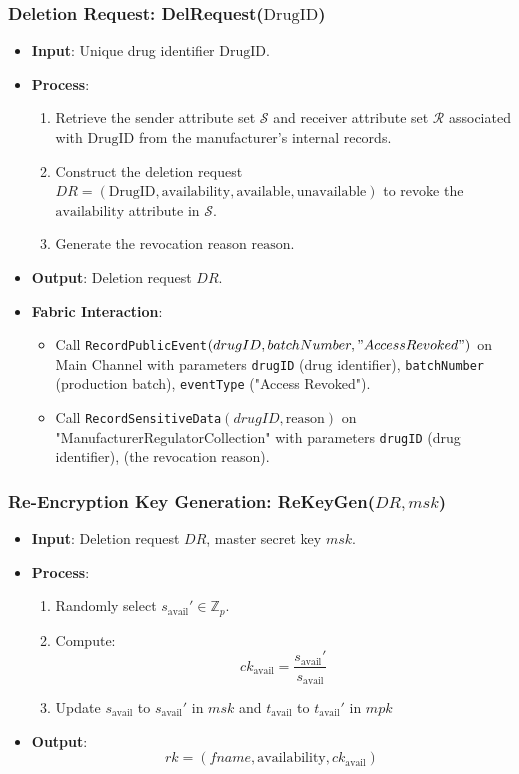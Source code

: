 \documentclass[runningheads]{llncs}
\begin{document}
\subsubsection{Deletion Request: DelRequest($\text{DrugID}$)}
\begin{itemize}
    \item \textbf{Input}: Unique drug identifier $\text{DrugID}$.
    \item \textbf{Process}:
    \begin{enumerate}
        \item Retrieve the sender attribute set $\mathcal{S}$ and receiver attribute set $\mathcal{R}$ associated with $\text{DrugID}$ from the manufacturer's internal records.
        \item Construct the deletion request $DR = (\text{DrugID}, \text{availability}, \text{available}, \text{unavailable})$ to revoke the $\text{availability}$ attribute in $\mathcal{S}$.
        \item Generate the revocation reason $\text{reason}$.
    \end{enumerate}
    \item \textbf{Output}: Deletion request $DR$.
    \item \textbf{Fabric Interaction}:
    \begin{itemize}
        \item Call \texttt{RecordPublicEvent$(drugID, batchNumber,\\ "Access Revoked")$} on Main Channel with parameters \texttt{drugID} (drug identifier), \texttt{batchNumber} (production batch), \texttt{eventType} ("Access Revoked").
        \item Call \texttt{RecordSensitiveData$(drugID, \text{reason})$} on "ManufacturerRegulatorCollection" with parameters \texttt{drugID} (drug identifier),  (the revocation reason).
    \end{itemize}
\end{itemize}

\subsubsection{Re-Encryption Key Generation: ReKeyGen($DR, msk$)}
\begin{itemize}
    \item \textbf{Input}: Deletion request $DR$, master secret key $msk$.
    \item \textbf{Process}:
    \begin{enumerate}
        \item Randomly select $s_{\text{avail}}' \in \mathbb{Z}_p$.
        \item Compute:
        \[
        ck_{\text{avail}} = \frac{s_{\text{avail}}'}{s_{\text{avail}}}
        \]
        \item Update $s_{\text{avail}}$ to $s_{\text{avail}}'$ in $msk$ and $t_{\text{avail}}$ to $t_{\text{avail}}'$ in $mpk$
    \end{enumerate}
    \item \textbf{Output}:
    \[
    rk = (fname, \text{availability}, ck_{\text{avail}})
    \]
\end{itemize}
\end{document}
